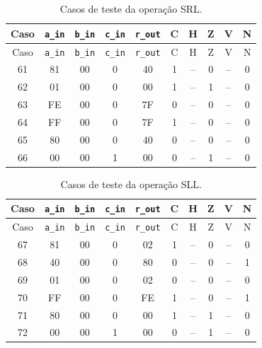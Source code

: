 \begin{longtable}{c c c c c c c c c c}
\caption{Casos de teste da operação SRL.}
\label{tab:testes-SRL}\\
\hline
Caso & \texttt{a\_in} & \texttt{b\_in} & \texttt{c\_in} & \texttt{r\_out} & C & H & Z & V & N \\ \hline
\endfirsthead
\hline
Caso & \texttt{a\_in} & \texttt{b\_in} & \texttt{c\_in} & \texttt{r\_out} & C & H & Z & V & N \\ \hline
\endhead
61 & 81 & 00 & 0 & 40 & 1 & {\footnotesize--} & 0 & {\footnotesize--} & 0 \\
62 & 01 & 00 & 0 & 00 & 1 & {\footnotesize--} & 1 & {\footnotesize--} & 0 \\
63 & FE & 00 & 0 & 7F & 0 & {\footnotesize--} & 0 & {\footnotesize--} & 0 \\
64 & FF & 00 & 0 & 7F & 1 & {\footnotesize--} & 0 & {\footnotesize--} & 0 \\
65 & 80 & 00 & 0 & 40 & 0 & {\footnotesize--} & 0 & {\footnotesize--} & 0 \\
66 & 00 & 00 & 1 & 00 & 0 & {\footnotesize--} & 1 & {\footnotesize--} & 0 \\
\hline
\end{longtable}
\vspace{-0.5cm}

\begin{longtable}{c c c c c c c c c c}
\caption{Casos de teste da operação SLL.}
\label{tab:testes-SLL}\\
\hline
Caso & \texttt{a\_in} & \texttt{b\_in} & \texttt{c\_in} & \texttt{r\_out} & C & H & Z & V & N \\ \hline
\endfirsthead
\hline
Caso & \texttt{a\_in} & \texttt{b\_in} & \texttt{c\_in} & \texttt{r\_out} & C & H & Z & V & N \\ \hline
\endhead
67 & 81 & 00 & 0 & 02 & 1 & {\footnotesize--} & 0 & {\footnotesize--} & 0 \\
68 & 40 & 00 & 0 & 80 & 0 & {\footnotesize--} & 0 & {\footnotesize--} & 1 \\
69 & 01 & 00 & 0 & 02 & 0 & {\footnotesize--} & 0 & {\footnotesize--} & 0 \\
70 & FF & 00 & 0 & FE & 1 & {\footnotesize--} & 0 & {\footnotesize--} & 1 \\
71 & 80 & 00 & 0 & 00 & 1 & {\footnotesize--} & 1 & {\footnotesize--} & 0 \\
72 & 00 & 00 & 1 & 00 & 0 & {\footnotesize--} & 1 & {\footnotesize--} & 0 \\
\hline
\end{longtable}
\vspace{-0.5cm}

